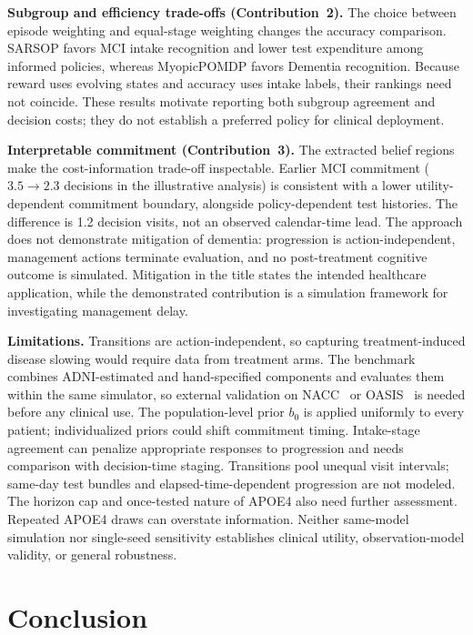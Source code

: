 \documentclass[conference,a4paper]{IEEEtran}
\begin{document}
\textbf{Subgroup and efficiency trade-offs (Contribution~2).}
The choice between episode weighting and equal-stage weighting changes
the accuracy comparison. SARSOP favors MCI intake recognition and
lower test expenditure among informed policies, whereas MyopicPOMDP
favors Dementia recognition. Because reward uses evolving states and
accuracy uses intake labels, their rankings need not coincide.
These results motivate reporting both subgroup agreement and decision
costs; they do not establish a preferred policy for clinical deployment.

\textbf{Interpretable commitment (Contribution~3).}
The extracted belief regions make the cost-information trade-off
inspectable. Earlier MCI commitment ($3.5\to2.3$ decisions in the
illustrative analysis) is consistent with a lower utility-dependent
commitment boundary, alongside policy-dependent test histories.
The difference is 1.2 decision visits, not an observed calendar-time
lead. The approach does not
demonstrate mitigation of dementia: progression is action-independent,
management actions terminate evaluation, and no post-treatment cognitive
outcome is simulated. Mitigation in the title states the intended
healthcare application, while the demonstrated contribution is a
simulation framework for investigating management delay.

\textbf{Limitations.}
Transitions are action-independent, so capturing treatment-induced
disease slowing would require data from treatment arms. The benchmark combines ADNI-estimated and hand-specified components
and evaluates them within the same simulator, so
external validation on NACC~\cite{beekly2007nacc} or
OASIS~\cite{marcus2007oasis} is needed before any clinical use. The
population-level prior $b_0$ is applied uniformly to every patient;
individualized priors could shift commitment timing. Intake-stage
agreement can penalize appropriate responses to progression and needs
comparison with decision-time staging. Transitions pool unequal visit
intervals; same-day test bundles and elapsed-time-dependent progression
are not modeled. The horizon cap and once-tested nature of APOE4
also need further assessment. Repeated APOE4 draws can overstate information. Neither
same-model simulation nor single-seed sensitivity establishes clinical
utility, observation-model validity, or general robustness.

\FloatBarrier
\section{Conclusion}
\end{document}
